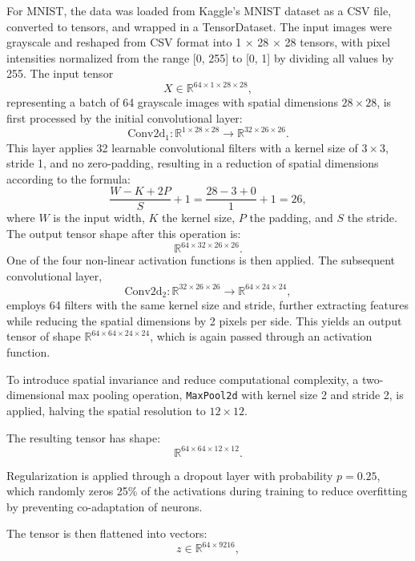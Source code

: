 \documentclass{article}
\begin{document}
For MNIST, the data was loaded from Kaggle's MNIST dataset as a CSV file, converted to tensors, and wrapped in a TensorDataset. The input images were grayscale and reshaped from CSV format into 1 × 28 × 28 tensors, with pixel intensities normalized from the range [0, 255] to [0, 1] by dividing all values by 255.  The input tensor 
\[
X \in \mathbb{R}^{64 \times 1 \times 28 \times 28},
\]
representing a batch of 64 grayscale images with spatial dimensions \(28 \times 28\), is first processed by the initial convolutional layer:
\[
\text{Conv2d}_1 : \mathbb{R}^{1 \times 28 \times 28} \rightarrow \mathbb{R}^{32 \times 26 \times 26}.
\]
This layer applies 32 learnable convolutional filters with a kernel size of \(3 \times 3\), stride 1, and no zero-padding, resulting in a reduction of spatial dimensions according to the formula:
\[
\frac{W - K + 2P}{S} + 1 = \frac{28 - 3 + 0}{1} + 1 = 26,
\]
where \(W\) is the input width, \(K\) the kernel size, \(P\) the padding, and \(S\) the stride. The output tensor shape after this operation is:
\[
\mathbb{R}^{64 \times 32 \times 26 \times 26}.
\]
One of the four non-linear activation functions is then applied. 
The subsequent convolutional layer,
\[
\text{Conv2d}_2 : \mathbb{R}^{32 \times 26 \times 26} \rightarrow \mathbb{R}^{64 \times 24 \times 24},
\]
employs 64 filters with the same kernel size and stride, further extracting features while reducing the spatial dimensions by 2 pixels per side. This yields an output tensor of shape \(\mathbb{R}^{64 \times 64 \times 24 \times 24}\), which is again passed through an activation function.

\vspace{4pt}

\noindent
To introduce spatial invariance and reduce computational complexity, a two-dimensional max pooling operation, \texttt{MaxPool2d} with kernel size 2 and stride 2, is applied, halving the spatial resolution to \(12 \times 12\).

\vspace{4pt}


\noindent
The resulting tensor has shape:
\[
\mathbb{R}^{64 \times 64 \times 12 \times 12}.
\]


\noindent
Regularization is applied through a dropout layer with probability \(p = 0.25\), which randomly zeros 25\% of the activations during training to reduce overfitting by preventing co-adaptation of neurons.


\vspace{4pt}
\noindent
The tensor is then flattened into vectors:
\[
z \in \mathbb{R}^{64 \times 9216},
\]
\end{document}
